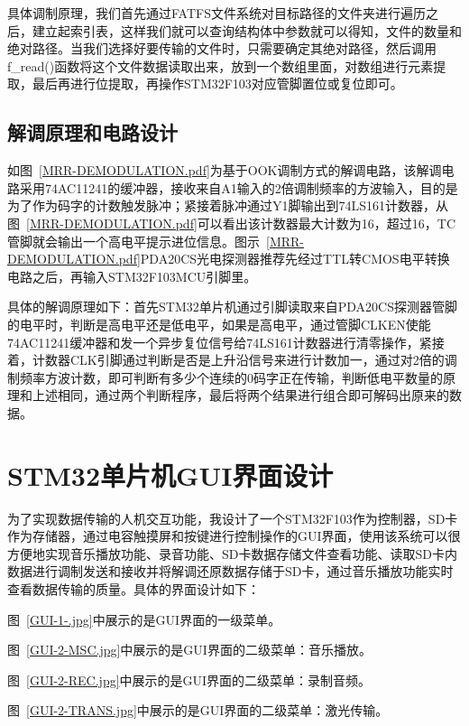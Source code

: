 具体调制原理，我们首先通过FATFS文件系统对目标路径的文件夹进行遍历之后，建立起索引表，这样我们就可以查询结构体中参数就可以得知，文件的数量和绝对路径。当我们选择好要传输的文件时，只需要确定其绝对路径，然后调用f\_read()函数将这个文件数据读取出来，放到一个数组里面，对数组进行元素提取，最后再进行位提取，再操作STM32F103对应管脚置位或复位即可。


\subsection{解调原理和电路设计}
如图~\ref{MRR-DEMODULATION.pdf}为基于OOK调制方式的解调电路，该解调电路采用74AC11241的缓冲器，接收来自A1输入的2倍调制频率的方波输入，目的是为了作为码字的计数触发脉冲；紧接着脉冲通过Y1脚输出到74LS161计数器，从图~\ref{MRR-DEMODULATION.pdf}可以看出该计数器最大计数为16，超过16，TC管脚就会输出一个高电平提示进位信息。图示~\ref{MRR-DEMODULATION.pdf}PDA20CS光电探测器推荐先经过TTL转CMOS电平转换电路之后，再输入STM32F103MCU引脚里。

具体的解调原理如下：首先STM32单片机通过引脚读取来自PDA20CS探测器管脚的电平时，判断是高电平还是低电平，如果是高电平，通过管脚CLKEN使能74AC11241缓冲器和发一个异步复位信号给74LS161计数器进行清零操作，紧接着，计数器CLK引脚通过判断是否是上升沿信号来进行计数加一，通过对2倍的调制频率方波计数，即可判断有多少个连续的0码字正在传输，判断低电平数量的原理和上述相同，通过两个判断程序，最后将两个结果进行组合即可解码出原来的数据。

\section{STM32单片机GUI界面设计}
为了实现数据传输的人机交互功能，我设计了一个STM32F103作为控制器，SD卡作为存储器，通过电容触摸屏和按键进行控制操作的GUI界面，使用该系统可以很方便地实现音乐播放功能、录音功能、SD卡数据存储文件查看功能、读取SD卡内数据进行调制发送和接收并将解调还原数据存储于SD卡，通过音乐播放功能实时查看数据传输的质量。具体的界面设计如下：

图~\ref{GUI-1-.jpg}中展示的是GUI界面的一级菜单。


图~\ref{GUI-2-MSC.jpg}中展示的是GUI界面的二级菜单：音乐播放。


图~\ref{GUI-2-REC.jpg}中展示的是GUI界面的二级菜单：录制音频。


图~\ref{GUI-2-TRANS.jpg}中展示的是GUI界面的二级菜单：激光传输。

